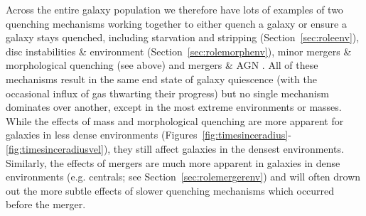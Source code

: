 \documentclass[useAMS,usenatbib]{mn2e}
\begin{document}
Across the entire galaxy population we therefore have lots of examples of two quenching mechanisms working together to either quench a galaxy or ensure a galaxy stays quenched, including starvation and stripping (Section~\ref{sec:roleenv}), disc instabilities \&  environment (Section~\ref{sec:rolemorphenv}), minor mergers \& morphological quenching (see above) and mergers \& AGN \citep{smethurst15, smethurst16}. All of these mechanisms result in the same end state of galaxy quiescence (with the occasional influx of gas thwarting their progress) but no single mechanism dominates over another, except in the most extreme environments or masses. While the effects of mass and morphological quenching are more apparent for galaxies in less dense environments (Figures~\ref{fig:timesinceradius}-\ref{fig:timesinceradiusvel}), they still affect galaxies in the densest environments. Similarly, the effects of mergers are much more apparent in galaxies in dense environments (e.g. centrals; see Section~\ref{sec:rolemergerenv}) and will often drown out the more subtle effects of slower quenching mechanisms which occurred before the merger. %

\end{document}
